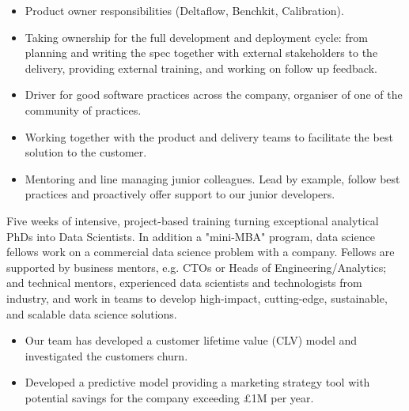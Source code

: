\documentclass[10pt,a4paper,ragged2e,withhyper]{altacv}
\begin{document}
\begin{paracol}{2}



\begin{itemize}
    \item Product owner responsibilities (Deltaflow, Benchkit, Calibration).
    \item Taking ownership for the full development and deployment cycle: from planning
    and writing the spec together with external stakeholders to the delivery,
    providing external training, and working on follow up feedback.
    \item Driver for good software practices across the company, organiser of one of
    the community of practices.
    \item Working together with the product and delivery teams to facilitate the
    best solution to the customer.
    \item Mentoring and line managing junior colleagues. Lead by example, follow best
    practices and proactively offer support to our junior developers.
\end{itemize}

\divider


Five weeks of intensive, project-based training turning exceptional analytical PhDs into Data Scientists.
In addition a "mini-MBA" program, data science fellows work on a commercial data science problem with a company.
Fellows are supported by business mentors, e.g. CTOs or Heads of Engineering/Analytics;
and technical mentors, experienced data scientists and technologists from industry,
and work in teams to develop high-impact, cutting-edge, sustainable, and scalable data science solutions.

\begin{itemize}
    \item Our team has developed a customer lifetime value (CLV) model and investigated the customers churn.
    \item Developed a predictive model providing a marketing strategy tool with potential savings
    for the company exceeding £1M per year.
\end{itemize}


\end{paracol}
\end{document}
